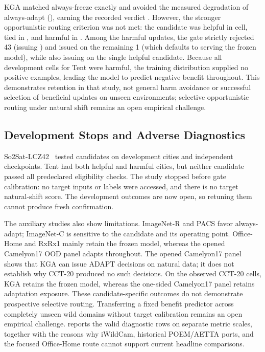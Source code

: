 KGA matched always-freeze exactly and avoided the measured degradation of always-adapt (\CCTSafeUtilityPass),
earning the recorded verdict \CCTVerdict. However, the stronger opportunistic routing criterion was not met:
the candidate was helpful in \CCTHelpfulCount{} cell, tied in \CCTZeroCount{}, and harmful in \CCTHarmfulCount{}.
Among the \CCTHarmfulCount{} harmful updates, the gate strictly rejected 43 (issuing \freeze) and issued \abstain
on the remaining 1 (which defaults to serving the frozen model), while also issuing \freeze on the single helpful candidate.
Because all development cells for Tent were harmful, the training distribution supplied no positive examples, leading the
model to predict negative benefit throughout.
This demonstrates retention in that study, not general harm avoidance or successful selection of beneficial updates on
unseen environments; selective opportunistic routing under natural shift remains an open empirical challenge.

\subsection{Development Stops and Adverse Diagnostics}
\label{sec:so2sat-development-stop}

So2Sat-LCZ42~\cite{zhu2020so2sat} tested \SoTwoCandidateCount{} candidates on
\SoTwoDevelopmentCityCount{} development cities and \SoTwoCheckpointCount{} independent
checkpoints. Tent had both helpful and harmful cities, but neither candidate passed all
predeclared eligibility checks. The study stopped before gate calibration: no target inputs or
labels were accessed, and there is no target natural-shift score. The development outcomes are
now open, so retuning them cannot produce fresh confirmation.

The auxiliary studies also show limitations. ImageNet-R and PACS favor always-adapt;
ImageNet-C is sensitive to the candidate and its operating point. Office-Home and RxRx1 mainly
retain the frozen model, whereas the opened Camelyon17 OOD panel adapts throughout.
The opened Camelyon17 panel shows that KGA can issue ADAPT decisions on natural data;
it does not establish why CCT-20 produced no such decisions. On the observed CCT-20 cells,
KGA retains the frozen model, whereas the one-sided Camelyon17 panel retains adaptation
exposure. These candidate-specific outcomes do not demonstrate prospective selective routing.
Transferring a fixed benefit predictor
across completely unseen wild domains without target calibration remains an open empirical challenge.
 reports the valid diagnostic rows on separate metric scales, together with the
reasons why iWildCam, historical POEM/AETTA ports, and the focused Office-Home route cannot support current
headline comparisons.

